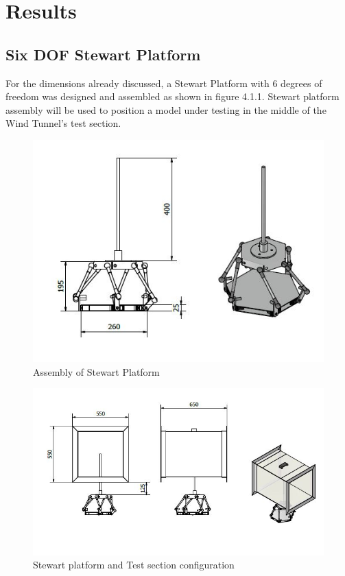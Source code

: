 \chapter{Results}
\section{Six DOF Stewart Platform}
For the dimensions already discussed, a Stewart Platform with 6 degrees of freedom was designed and assembled as shown in figure 4.1.1.
Stewart platform assembly will be used to position a model under testing in the middle of the Wind Tunnel's test section.
\begin{center}
	\begin{figure}[!h]
	\centering
	\includegraphics[width=0.8\linewidth]{Figures/Assembly}
	\caption[Assembled Platform]{Assembly of Stewart Platform}
	\end{figure}
\end{center}
\begin{center}
	\begin{figure}[!h]
	\centering
	\includegraphics[width=0.8\linewidth]{Figures/Test-section}
	\caption[Model placement in Test Section]{Stewart platform and Test section configuration}
	\end{figure}
\end{center}
\clearpage
